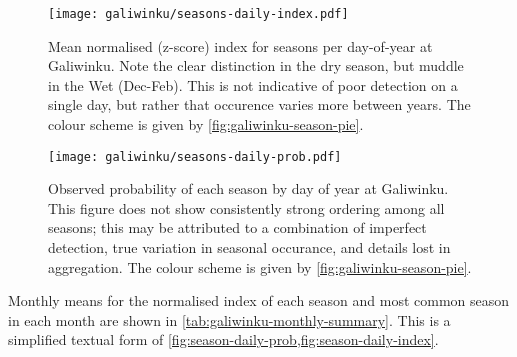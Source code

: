 \begin{figure}[p]
    \centering
    \texttt{[image: galiwinku/seasons-daily-index.pdf]}
    \caption[Season index by day-of-year, Galiwinku]{
        Mean normalised (z-score) index for seasons per day-of-year
        at Galiwinku.  Note the clear distinction in the dry season,
        but muddle in the Wet (Dec-Feb).
        This is not indicative of poor detection on a single day,
        but rather that occurence varies more between years.
        The colour scheme is given by \cref{fig:galiwinku-season-pie}.
        }
    \label{fig:season-daily-index}
\vspace{1cm}
    \texttt{[image: galiwinku/seasons-daily-prob.pdf]}
    \caption[Season probability by day-of-year, Galiwinku]{
        Observed probability of each season by day of year at Galiwinku.
        This figure does not show consistently strong ordering among all
        seasons; this may be attributed to a combination of imperfect
        detection, true variation in seasonal occurance, and details
        lost in aggregation.
        The colour scheme is given by \cref{fig:galiwinku-season-pie}.
        }
    \label{fig:season-daily-prob}
\end{figure}


\FloatBarrier

Monthly means for the normalised index of each season and most common season
in each month are shown in \cref{tab:galiwinku-monthly-summary}.  This is
a simplified textual form of \cref{fig:season-daily-prob,fig:season-daily-index}.


